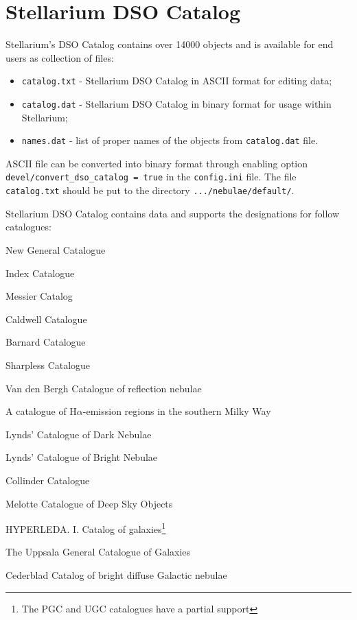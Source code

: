 \section{Stellarium DSO Catalog}%
\label{sec:dso:catalog}

Stellarium's DSO Catalog contains over 14000 objects and is available
for end users as collection of files:

\begin{itemize}
\item
  \texttt{catalog.txt} - Stellarium DSO Catalog in ASCII format for
  editing data;
\item
  \texttt{catalog.dat} - Stellarium DSO Catalog in binary format for
  usage within Stellarium;
\item
  \texttt{names.dat} - list of proper names of the objects from
  \texttt{catalog.dat} file.
\end{itemize}

ASCII file can be converted into binary format through enabling option
\texttt{devel/convert\_dso\_catalog\ =\ true} in the \texttt{config.ini}
file. The file \texttt{catalog.txt} should be put to the directory
\texttt{.../nebulae/default/}.

Stellarium DSO Catalog contains data and supports the designations for
follow catalogues:

\begin{description}[align=right,labelwidth=2cm]
\item[\textbf{NGC}]  New General Catalogue 
\item[\textbf{IC}] Index Catalogue 
\item[\textbf{M}] Messier Catalog
\item[\textbf{C}] Caldwell Catalogue 
\item[\textbf{B}] Barnard Catalogue 
\item[\textbf{Sh2}] Sharpless Catalogue 
\item[\textbf{VdB}] Van den Bergh Catalogue of reflection nebulae 
\item[\textbf{RCW}]  A catalogue of H$\alpha$-emission regions in the southern Milky Way 
\item[\textbf{LDN}]  Lynds' Catalogue of Dark Nebulae 
\item[\textbf{LBN}]  Lynds' Catalogue of Bright Nebulae 
\item[\textbf{Cr}] Collinder Catalogue 
\item[\textbf{Mel}]  Melotte Catalogue of Deep Sky Objects 
\item[\textbf{PGC}]  HYPERLEDA. I. Catalog of galaxies\footnote{The PGC and UGC catalogues have a partial support}
\item[\textbf{UGC}]  The Uppsala General Catalogue of Galaxies
\item[\textbf{Ced}]  Cederblad Catalog of bright diffuse Galactic nebulae 
\end{description}



